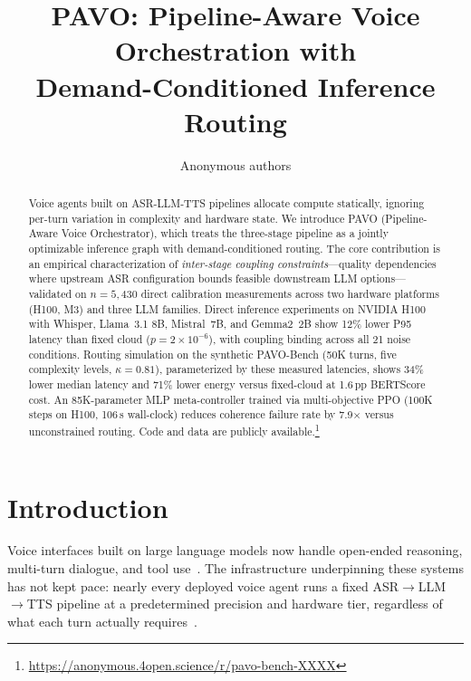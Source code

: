 \documentclass{article}
\title{PAVO: Pipeline-Aware Voice Orchestration with\\Demand-Conditioned Inference Routing}
\author{Anonymous authors}
\begin{document}
\maketitle

\begin{abstract}
Voice agents built on ASR-LLM-TTS pipelines allocate compute statically, ignoring per-turn variation in complexity and hardware state. We introduce PAVO (Pipeline-Aware Voice Orchestrator), which treats the three-stage pipeline as a jointly optimizable inference graph with demand-conditioned routing. The core contribution is an empirical characterization of \emph{inter-stage coupling constraints}---quality dependencies where upstream ASR configuration bounds feasible downstream LLM options---validated on $n=5{,}430$ direct calibration measurements across two hardware platforms (H100, M3) and three LLM families. Direct inference experiments on NVIDIA H100 with Whisper, Llama~3.1 8B, Mistral~7B, and Gemma2~2B show 12\% lower P95 latency than fixed cloud ($p = 2\times10^{-6}$), with coupling binding across all 21 noise conditions. Routing simulation on the synthetic PAVO-Bench (50K turns, five complexity levels, $\kappa=0.81$), parameterized by these measured latencies, shows 34\% lower median latency and 71\% lower energy versus fixed-cloud at 1.6\,pp BERTScore cost. An 85K-parameter MLP meta-controller trained via multi-objective PPO (100K steps on H100, 106\,s wall-clock) reduces coherence failure rate by 7.9$\times$ versus unconstrained routing. Code and data are publicly available.\footnote{\url{https://anonymous.4open.science/r/pavo-bench-XXXX}}
\end{abstract}

\section{Introduction}
\label{sec:intro}

Voice interfaces built on large language models now handle open-ended reasoning, multi-turn dialogue, and tool use~\citep{openai2024gpt4o,dubey2024llama3,team2024gemma2}. The infrastructure underpinning these systems has not kept pace: nearly every deployed voice agent runs a fixed ASR$\to$LLM$\to$TTS pipeline at a predetermined precision and hardware tier, regardless of what each turn actually requires~\citep{oord2016wavenet,ren2021fastspeech,kim2021vits,dettmers2022llmint8,frantar2022gptq,lin2024awq}.
\end{document}

